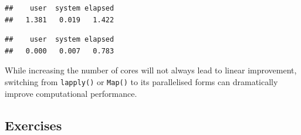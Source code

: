 \begin{Shaded}
\begin{Highlighting}[]
\StringTok{ }\NormalTok{(x) x[}\NormalTok{(}\NormalTok{ T), ]}
\StringTok{ }\OperatorTok{$}
\StringTok{ }
  \NormalTok{(}\OperatorTok{~}\StringTok{ }\OperatorTok{+}\StringTok{ } 
\NormalTok{\}}

\NormalTok{(}\NormalTok{(}\OperatorTok{:}
\end{Highlighting}
\end{Shaded}

\begin{verbatim}
##    user  system elapsed 
##   1.381   0.019   1.422
\end{verbatim}

\begin{Shaded}
\begin{Highlighting}[]
\NormalTok{(}\NormalTok{(}\OperatorTok{:} \NormalTok{))}
\end{Highlighting}
\end{Shaded}

\begin{verbatim}
##    user  system elapsed 
##   0.000   0.007   0.783
\end{verbatim}

While increasing the number of cores will not always lead to linear
improvement, switching from \texttt{lapply()} or \texttt{Map()} to its
parallelised forms can dramatically improve computational performance.

\hypertarget{exercises-1}{%
\subsection{Exercises}\label{exercises-1}}

